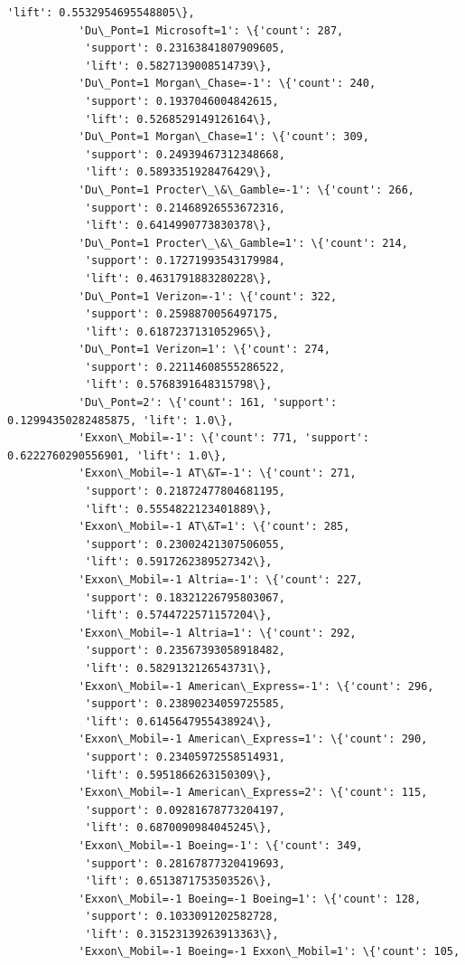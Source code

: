 \documentclass[11pt]{article}
\begin{document}
\begin{Verbatim}[commandchars=\\\{\}]
            'lift': 0.5532954695548805\},
           'Du\_Pont=1 Microsoft=1': \{'count': 287,
            'support': 0.23163841807909605,
            'lift': 0.5827139008514739\},
           'Du\_Pont=1 Morgan\_Chase=-1': \{'count': 240,
            'support': 0.1937046004842615,
            'lift': 0.5268529149126164\},
           'Du\_Pont=1 Morgan\_Chase=1': \{'count': 309,
            'support': 0.24939467312348668,
            'lift': 0.5893351928476429\},
           'Du\_Pont=1 Procter\_\&\_Gamble=-1': \{'count': 266,
            'support': 0.21468926553672316,
            'lift': 0.6414990773830378\},
           'Du\_Pont=1 Procter\_\&\_Gamble=1': \{'count': 214,
            'support': 0.17271993543179984,
            'lift': 0.4631791883280228\},
           'Du\_Pont=1 Verizon=-1': \{'count': 322,
            'support': 0.2598870056497175,
            'lift': 0.6187237131052965\},
           'Du\_Pont=1 Verizon=1': \{'count': 274,
            'support': 0.22114608555286522,
            'lift': 0.5768391648315798\},
           'Du\_Pont=2': \{'count': 161, 'support': 0.12994350282485875, 'lift': 1.0\},
           'Exxon\_Mobil=-1': \{'count': 771, 'support': 0.6222760290556901, 'lift': 1.0\},
           'Exxon\_Mobil=-1 AT\&T=-1': \{'count': 271,
            'support': 0.21872477804681195,
            'lift': 0.5554822123401889\},
           'Exxon\_Mobil=-1 AT\&T=1': \{'count': 285,
            'support': 0.23002421307506055,
            'lift': 0.5917262389527342\},
           'Exxon\_Mobil=-1 Altria=-1': \{'count': 227,
            'support': 0.18321226795803067,
            'lift': 0.5744722571157204\},
           'Exxon\_Mobil=-1 Altria=1': \{'count': 292,
            'support': 0.23567393058918482,
            'lift': 0.5829132126543731\},
           'Exxon\_Mobil=-1 American\_Express=-1': \{'count': 296,
            'support': 0.23890234059725585,
            'lift': 0.6145647955438924\},
           'Exxon\_Mobil=-1 American\_Express=1': \{'count': 290,
            'support': 0.23405972558514931,
            'lift': 0.5951866263150309\},
           'Exxon\_Mobil=-1 American\_Express=2': \{'count': 115,
            'support': 0.09281678773204197,
            'lift': 0.6870090984045245\},
           'Exxon\_Mobil=-1 Boeing=-1': \{'count': 349,
            'support': 0.28167877320419693,
            'lift': 0.6513871753503526\},
           'Exxon\_Mobil=-1 Boeing=-1 Boeing=1': \{'count': 128,
            'support': 0.1033091202582728,
            'lift': 0.31523139263913363\},
           'Exxon\_Mobil=-1 Boeing=-1 Exxon\_Mobil=1': \{'count': 105,

\end{Verbatim}
\end{document}
